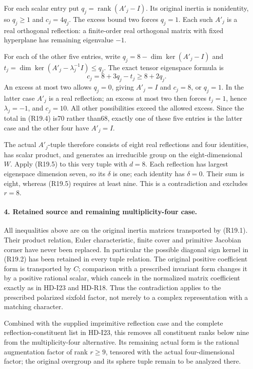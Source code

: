 For each scalar entry put \(q_j=\operatorname{rank}(A'_j-I)\).
Its original inertia is nonidentity, so \(q_j\ge1\)
and \(c_j=4q_j\). The excess bound two forces
\(q_j=1\). Each such \(A'_j\) is a real orthogonal
reflection: a finite-order real orthogonal matrix with
fixed hyperplane has remaining eigenvalue \(-1\).

For each of the other five entries, write
\(q_j=8-\dim\ker(A'_j-I)\) and
\(t_j=\dim\ker(A'_j-\lambda_j^{-1}I)\le q_j\).
The exact tensor eigenspace formula is
\[
                  c_j=8+3q_j-t_j\ge8+2q_j.              \tag{R19.8}
\]
An excess at most two allows \(q_j=0\), giving
\(A'_j=I\) and \(c_j=8\), or \(q_j=1\).
In the latter case \(A'_j\) is a real reflection;
an excess at most two then forces \(t_j=1\), hence
\(\lambda_j=-1\), and \(c_j=10\). All other
possibilities exceed the allowed excess. Since the
total in (R19.4) is70 rather than68, exactly one of
these five entries is the latter case and the other
four have \(A'_j=I\).

The actual \(A'_j\)-tuple therefore consists of eight
real reflections and four identities, has scalar
product, and generates an irreducible group on the
eight-dimensional \(W\). Apply (R19.5) to this very
tuple with \(d=8\). Each reflection has largest
eigenspace dimension seven, so its \(\delta\) is one;
each identity has \(\delta=0\). Their sum is eight,
whereas (R19.5) requires at least nine. This is a
contradiction and excludes \(r=8\).

\paragraph{4. Retained source and remaining multiplicity-four case.}
All inequalities above are on the original inertia
matrices transported by (R19.1). Their product relation,
Euler characteristic, finite cover and primitive
Jacobian corner have never been replaced. In particular
the possible diagonal sign kernel in (R19.2) has been
retained in every tuple relation. The original positive
coefficient form is transported by \(C\); comparison
with a prescribed invariant form changes it by a
positive rational scalar, which cancels in the normalized
matrix coefficient exactly as in HD-I23 and HD-R18.
Thus the contradiction applies to the prescribed
polarized sixfold factor, not merely to a complex
representation with a matching character.

Combined with the supplied imprimitive reflection
case and the complete reflection-constituent list
in HD-I23, this removes all constituent ranks below
nine from the multiplicity-four alternative. Its
remaining actual form is the rational augmentation
factor of rank \(r\ge9\), tensored with the actual
four-dimensional factor; the original overgroup and
its sphere tuple remain to be analyzed there.
